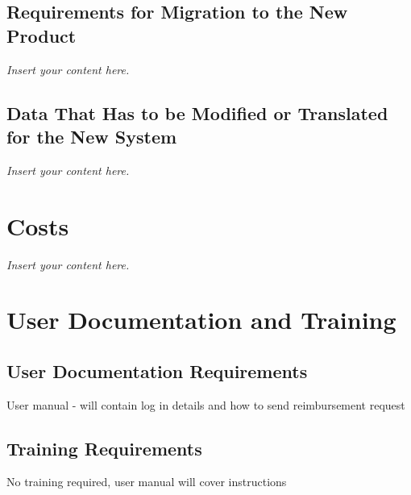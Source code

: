 \documentclass[12pt]{article}
\newcommand{\lips}{\textit{Insert your content here.}}
\begin{document}
\subsection{Requirements for Migration to the New Product}
\lips
\subsection{Data That Has to be Modified or Translated for the New System}
\lips

\section{Costs}
\lips
\section{User Documentation and Training}
\subsection{User Documentation Requirements}
User manual - will contain log in details and how to send reimbursement request

\subsection{Training Requirements}
No training required, user manual will cover instructions
\end{document}
